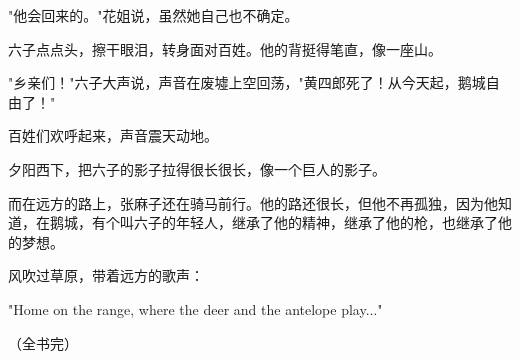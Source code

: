 "他会回来的。"花姐说，虽然她自己也不确定。

六子点点头，擦干眼泪，转身面对百姓。他的背挺得笔直，像一座山。

"乡亲们！"六子大声说，声音在废墟上空回荡，"黄四郎死了！从今天起，鹅城自由了！"

百姓们欢呼起来，声音震天动地。

夕阳西下，把六子的影子拉得很长很长，像一个巨人的影子。

而在远方的路上，张麻子还在骑马前行。他的路还很长，但他不再孤独，因为他知道，在鹅城，有个叫六子的年轻人，继承了他的精神，继承了他的枪，也继承了他的梦想。

风吹过草原，带着远方的歌声：

"Home on the range, where the deer and the antelope play..."

（全书完）